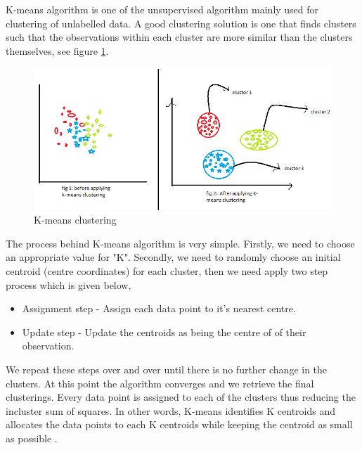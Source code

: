 \documentclass[format=sigconf]{acmart}
\begin{document}
K-means algorithm is one of the unsupervised algorithm mainly used for clustering of unlabelled data. A good clustering solution 
is one that finds clusters such that the observations within each cluster are more similar than the clusters themselves, see figure
\ref{fig:kmeans}.
\begin{figure}[H]
    \centering
    \includegraphics[scale=0.38]{images/kmeans.png}
    \caption{K-means clustering}
    \label{fig:kmeans}
\end{figure}
The process behind K-means algorithm is very simple. Firstly, we need to choose an appropriate value for "K". Secondly, we need to 
randomly choose an initial centroid (centre coordinates) for each cluster, then we need apply two step process which is given below,
\begin{itemize}
    \item Assignment step - Assign each data point to it's nearest centre.
    \item Update step - Update the centroids as being the centre of of their observation.
\end{itemize}
We repeat these steps over and over until there is no further change in the clusters. At this point the algorithm converges and 
we retrieve the final clusterings. Every data point is assigned to each of the clusters thus reducing the incluster sum of squares.
In other words, K-means identifies K centroids and allocates the data points to each K centroids while keeping the centroid as small
as possible \cite{kmeans}. 
\end{document}
